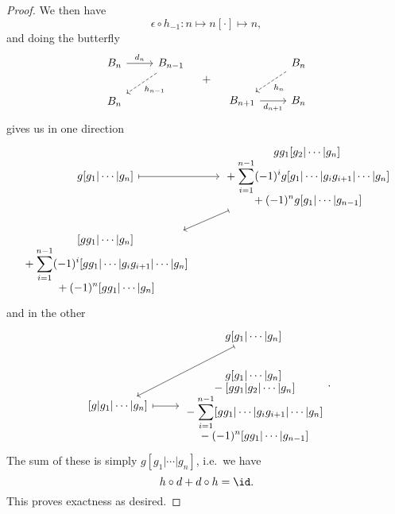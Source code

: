 \documentclass[main.tex]{subfiles}
\begin{document}
\begin{proof}
  We then have
  \begin{equation*}
    \epsilon \circ h_{-1}\colon n \mapsto n[\cdot] \mapsto n,
  \end{equation*}
  and doing the butterfly
  \begin{equation*}
    \begin{tikzcd}
      B_{n}
      \arrow[r, "d_{n}"]
      & B_{n-1}
      \arrow[dl, dashed, "h_{n-1}"]
      \\
      B_{n}
    \end{tikzcd}
    \quad + \quad
    \begin{tikzcd}
      & B_{n}
      \arrow[dl, dashed, "h_{n}"]
      \\
      B_{n+1}
      \arrow[r, swap, "d_{n+1}"]
      & B_{n}
    \end{tikzcd}
  \end{equation*}
  gives us in one direction
  \begin{equation*}
    \begin{tikzcd}
      g[g_{1}|\cdots|g_{n}]
      \arrow[r, mapsto]
      & \substack{
        \displaystyle gg_{1}[g_{2}|\cdots|g_{n}] \\
        \displaystyle {}+ \sum_{i = 1}^{n-1} (-1)^{i} g [g_{1}|\cdots|g_{i}g_{i+1}|\cdots|g_{n}] \\
        \displaystyle {}+ (-1)^{n} g[g_{1}|\cdots|g_{n-1}]
      }
      \arrow[dl, mapsto]
      \\
      \substack{
        \displaystyle [gg_{1}|\cdots|g_{n}] \\
        \displaystyle {}+ \sum_{i = 1}^{n-1} (-1)^{i} [gg_{1}|\cdots| g_{i} g_{i+1} | \cdots | g_{n}] \\
        \displaystyle {}+ (-1)^{n} [gg_{1}|\cdots|g_{n}]
      }
    \end{tikzcd}
  \end{equation*}
  and in the other
  \begin{equation*}
    \begin{tikzcd}
      & g[g_{1}|\cdots|g_{n}]
      \arrow[dl, mapsto]
      \\
      {[g|g_{1}|\cdots|g_{n}]}
      \arrow[r, mapsto]
      & \substack{
        \displaystyle g[g_{1}|\cdots|g_{n}] \\
        \displaystyle {}- [gg_{1}|g_{2}|\cdots|g_{n}] \\
        \displaystyle {}- \sum_{i = 1}^{n-1} [gg_{1}|\cdots|g_{i}g_{i+1}|\cdots|g_{n}] \\
        \displaystyle {}- (-1)^{n} [gg_{1}|\cdots|g_{n-1}]
      }
    \end{tikzcd}.
  \end{equation*}
  The sum of these is simply $g[g_{1}|\cdots|g_{n}]$, i.e.\ we have
  \begin{equation*}
    h \circ d + d \circ h = \id.
  \end{equation*}
  This proves exactness as desired.
\end{proof}
\end{document}
